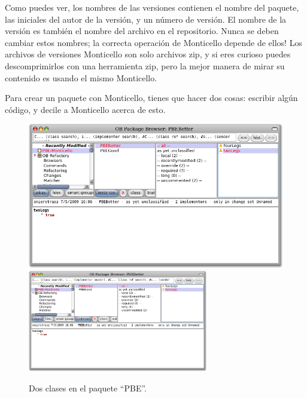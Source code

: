 \documentclass[spanish,a4paper,10pt,twoside]{book}
\begin{document}
Como puedes ver, los nombres de las versiones contienen el nombre del paquete, las iniciales del autor de la versi\'on, y un n\'umero de versi\'on.  El nombre de la versi\'on es tambi\'en el nombre del archivo en el repositorio.  Nunca se deben cambiar estos nombres; la correcta operaci\'on de Monticello depende de ellos!   Los archivos de versiones Monticello son solo archivos zip, y si eres curioso puedes descomprimirlos con una herramienta zip, pero la mejor manera de mirar su contenido es usando el mismo Monticello.

Para crear un paquete con Monticello, tienes que hacer dos cosas: escribir alg\'un c\'odigo, y decile a Monticello acerca de esto.


\begin{figure}[btp]
	\begin{center}
	\ifluluelse
		{\includegraphics[width=\textwidth]{MCnewcategory}}
		{\includegraphics[width=0.7\textwidth]{MCnewcategory}}
	\end{center}
	\caption{Dos clases en el paquete ``PBE''.}
\end{figure}
\end{document}
